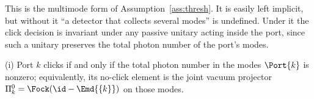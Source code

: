 
This is the multimode form of Assumption~\ref{ass:thresh}. It is easily left
implicit, but without it ``a detector that collects several modes'' is
undefined. Under it the click decision is invariant under any passive unitary
acting inside the port, since such a unitary preserves the total photon number
of the port's modes.

\begin{assumption}\label{ass:port}
(i) Port $k$ clicks if and only if the total photon number in the modes
$\Port{k}$ is nonzero; equivalently, its no-click element is the joint vacuum
projector $\Pi^0_k=\Fock(\id-\Emd{\{k\}})$ on those modes.
\end{assumption}
